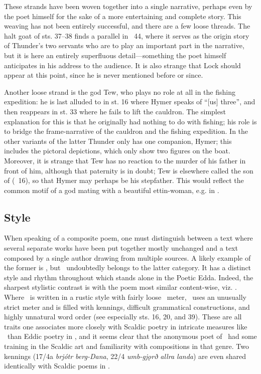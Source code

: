 {These strands have been woven together into a single narrative, perhaps even by the poet himself for the sake of a more entertaining and complete story. This weaving has not been entirely successful, and there are a few loose threads.  The halt goat of sts. 37–38 finds a parallel in \Gylfaginning\ 44, where it serves as the origin story of Thunder’s two servants who are to play an important part in the narrative, but it is here an entirely superfluous detail—something the poet himself anticipates in his address to the audience.  It is also strange that Lock should appear at this point, since he is never mentioned before or since.

Another loose strand is the god Tew, who plays no role at all in the fishing expedition: he is last alluded to in st. 16 where Hymer speaks of “[us] three”, and then reappears in st. 33 where he fails to lift the cauldron.  The simplest explanation for this is that he originally had nothing to do with fishing; his role is to bridge the frame-narrative of the cauldron and the fishing expedition.  In the other variants of the latter Thunder only has one companion, Hymer; this includes the pictoral depictions, which only show two figures on the boat.  Moreover, it is strange that Tew has no reaction to the murder of his father in front of him, although that paternity is in doubt; Tew is elsewhere called the son of  (\Skaldskaparmal\ 16), so that Hymer may perhaps be his stepfather.  This would reflect the common motif of a god mating with a beautiful ettin-woman, e.g. in \Skirnismal.}

\subsection{Style}

{\small When speaking of a composite poem, one must distinguish between a text where several separate works have been put together mostly unchanged and a text composed by a single author drawing from multiple sources.  A likely example of the former is \Havamal, but \Hymiskvida\ undoubtedly belongs to the latter category.  It has a distinct style and rhythm throughout which stands alone in the Poetic Edda.  Indeed, the sharpest stylistic contrast is with the poem most similar content-wise, viz. \Thrymskvida.  Where \Thrymskvida\ is written in a rustic style with fairly loose \Fornyrdislag\ meter, \Hymiskvida\ uses an unusually strict meter and is filled with kennings, difficult grammatical constructions, and highly unnatural word order (see especially sts. 16, 20, and 39).  These are all traits one associates more closely with Scaldic poetry in intricate measures like \Drottkvett\ than Eddic poetry in \Fornyrdislag, and it seems clear that the anonymous poet of \Hymiskvida\ had some training in the Scaldic art and familiarity with compositions in that genre.  Two kennings (17/4a \emph{brjótr berg-Dana}, 22/4 \emph{umb-gjǫrð allra landa}) are even shared identically with Scaldic poems in \Drottkvett.}

